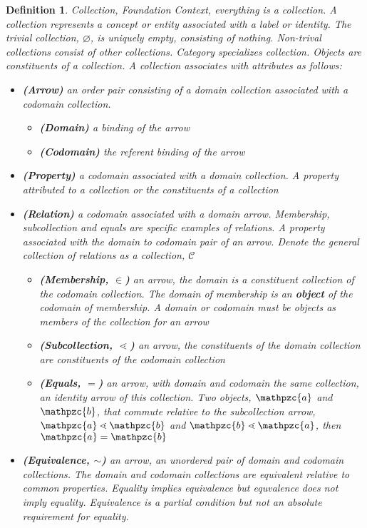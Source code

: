 \documentclass[aps,twocolumn,secnumarabic,nobalancelastpage,amsmath,amssymb,
amsthm,nofootinbib,parskip=full]{revtex4}
\numberwithin{equation}{section}
\newtheorem{definition}{Definition}[section]
\newcommand{\obk}[1]{\mathpzc{#1}}
\begin{document}
\begin{definition}{Collection, Foundation Context}\label{def:collection},
  everything is a collection. A collection represents a concept or entity
  associated with a label or identity.
  The trivial collection, $\varnothing$, is uniquely empty,
  consisting of nothing. Non-trival collections consist of other collections.
  Category specializes collection. Objects are constituents of a collection.
  A collection associates with attributes as follows:
\begin{itemize}
\item\textbf{(Arrow)} an order pair consisting of a domain collection
  associated with a codomain collection.
  \begin{itemize}
    \item\textbf{(Domain)} a binding of the arrow
    \item\textbf{(Codomain)} the referent binding of the arrow
 \end{itemize}
\item\textbf{(Property)} a codomain associated with a domain collection.
  A property attributed to a collection or the constituents of a collection
\item\textbf{(Relation)} a codomain associated with a domain arrow.
  Membership, subcollection and equals are specific examples of relations.
  A property associated with the domain to codomain pair of an arrow.
  Denote the general collection of relations as a collection, $\mathcal{C}$
  \begin{itemize}
    \item\textbf{(Membership, $\in$)} an arrow, the domain
      is a constituent collection of the codomain collection.
      The domain of membership is an \textbf{object} of the
      codomain of membership. A domain or codomain must be objects
      as members of the collection for an arrow
    \item\textbf{(Subcollection, $\lessdot$)} an arrow, the constituents of the
      domain collection are constituents of the codomain collection
    \item\textbf{(Equals, $=$)} an arrow, with domain and codomain
      the same collection, an identity arrow of this collection.
      Two objects, $\obk{a}$ and $\obk{b}$, that commute relative
      to the subcollection arrow, $\obk{a}\lessdot\obk{b}$ and
      $\obk{b}\lessdot\obk{a}$, then $\obk{a}=\obk{b}$
 \end{itemize}
\item\textbf{(Equivalence, $\sim$)} an arrow, an unordered pair
  of domain and codomain collections. The domain and codomain
  collections are equivalent relative to common properties.
  Equality implies equivalence but equvalence does not imply equality.
  Equivalence is a partial condition but not an absolute requirement
  for equality.
\end{itemize}
\end{definition}
\end{document}
